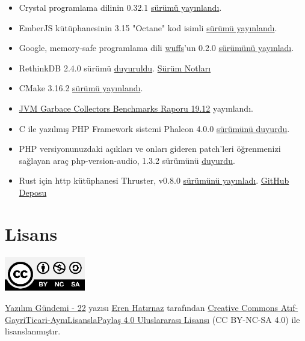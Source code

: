 \documentclass[11pt]{article}
\begin{document}
\begin{itemize}
\item Crystal programlama dilinin 0.32.1 \href{https://crystal-lang.org/2019/12/18/crystal-0.32.1-released.html}{sürümü yayınlandı}.
\item EmberJS kütüphanesinin 3.15 "Octane" kod isimli \href{https://blog.emberjs.com/2019/12/20/ember-3-15-released.html}{sürümü yayınlandı}.
\item Google, memory-safe programlama dili \href{https://github.com/google/wuffs}{wuffs}'un 0.2.0 \href{https://groups.google.com/forum/m/\#!topic/wuffs/Ui9d3usmZNc}{sürümünü yayınladı}.
\item RethinkDB 2.4.0 sürümü \href{https://rethinkdb.com/blog/2.4.0-release}{duyuruldu}. \href{https://github.com/rethinkdb/rethinkdb/blob/v2.4.x/NOTES.md\#release-240-night-of-the-living-dead}{Sürüm Notları}
\item CMake 3.16.2 \href{https://blog.kitware.com/cmake-3-16-2-available-for-download/}{sürümü yayınlandı}.
\item \href{https://ionutbalosin.com/2019/12/jvm-garbage-collectors-benchmarks-report-19-12/}{JVM Garbace Collectors Benchmarks Raporu 19.12} yayınlandı.
\item C ile yazılmış PHP Framework sistemi Phalcon 4.0.0 \href{https://blog.phalcon.io/post/phalcon-4-0-0-released}{sürümünü duyurdu}.
\item PHP versiyonunuzdaki açıkları ve onları gideren patch'leri öğrenmenizi
sağlayan araç php-version-audio, 1.3.2 sürümünü \href{https://github.com/lightswitch05/php-version-audit/releases/tag/1.3.2}{duyurdu}.
\item Rust için http kütüphanesi Thruster, v0.8.0 \href{https://www.reddit.com/r/rust/comments/edss48/announcing\_thruster\_080\_stable\_asyncawait\_updated/}{sürümünü yayınladı}. \href{https://github.com/trezm/Thruster}{GitHub Deposu}
\end{itemize}
\section{Lisans}
\label{sec:org4fbf47a}
\begin{center}
\begin{center}
\includegraphics[height=1.5cm]{../../../img/CC_BY-NC-SA_4.0.png}
\end{center}

\href{yazilim-gundemi-22.pdf}{Yazılım Gündemi - 22} yazısı \href{https://erenhatirnaz.github.io}{Eren Hatırnaz} tarafından \href{http://creativecommons.org/licenses/by-nc-sa/4.0/}{Creative Commons
Atıf-GayriTicari-AynıLisanslaPaylaş 4.0 Uluslararası Lisansı} (CC BY-NC-SA 4.0)
ile lisanslanmıştır.
\end{center}
\end{document}
